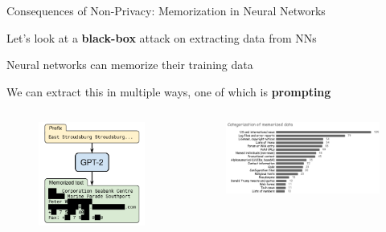 \documentclass[12pt,aspectratio=169]{beamer}
\begin{document}
\begin{frame}{Consequences of Non-Privacy: Memorization in Neural Networks}

Let's look at a \textbf{black-box} attack on extracting data from NNs

Neural networks can memorize their training data \citep{carlini2021extracting}

We can extract this in multiple ways, one of which is \textbf{prompting}

\begin{columns}[c]

\begin{column}{.5\textwidth}

\begin{figure}
    \centering
    \includegraphics[width=0.75\linewidth]{figures/GPT-2-memorization.PNG}
\end{figure}

\end{column}

\begin{column}{.5\textwidth}

\begin{figure}
    \centering
    \includegraphics[width=1\linewidth]{figures/GPT-2-list-of-memorizations.png}
\end{figure}

\end{column}
\end{columns}

\end{frame}
\end{document}
